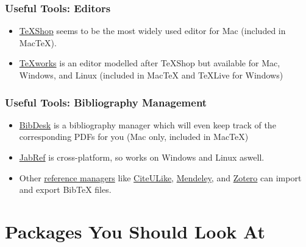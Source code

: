 \begin{frame}
\frametitle{Useful Tools: Editors}

\begin{itemize}
\item \href{http://pages.uoregon.edu/koch/texshop/texshop.html}{TeXShop} seems to be the most widely used editor for Mac (included in MacTeX).
\item \href{http://www.tug.org/texworks/}{TeXworks} is an editor modelled after TeXShop but available for Mac, Windows, and Linux (included in MacTeX and TeXLive for Windows)
\end{itemize}

\end{frame}

\begin{frame}
\frametitle{Useful Tools: Bibliography Management}

\begin{itemize}
\item \href{http://bibdesk.sourceforge.net/}{BibDesk} is a bibliography manager which will even keep track of the corresponding PDFs for you (Mac only, included in MacTeX)
\item \href{http://jabref.sourceforge.net/}{JabRef} is cross-platform, so works on Windows and Linux aswell.
\item Other \href{http://en.wikipedia.org/wiki/Comparison_of_reference_management_software}{reference managers} like \href{http://www.citeulike.org/}{CiteULike}, \href{http://www.mendeley.com/}{Mendeley}, and \href{http://www.zotero.org/}{Zotero} can import and export Bib\TeX{} files. 
\end{itemize}

\end{frame}

\begin{frame}
\frametitle{}

\begin{itemize}
\end{itemize}

\end{frame}

\begin{frame}
\frametitle{}

\begin{itemize}
\end{itemize}

\end{frame}


\section{Packages You Should Look At}

